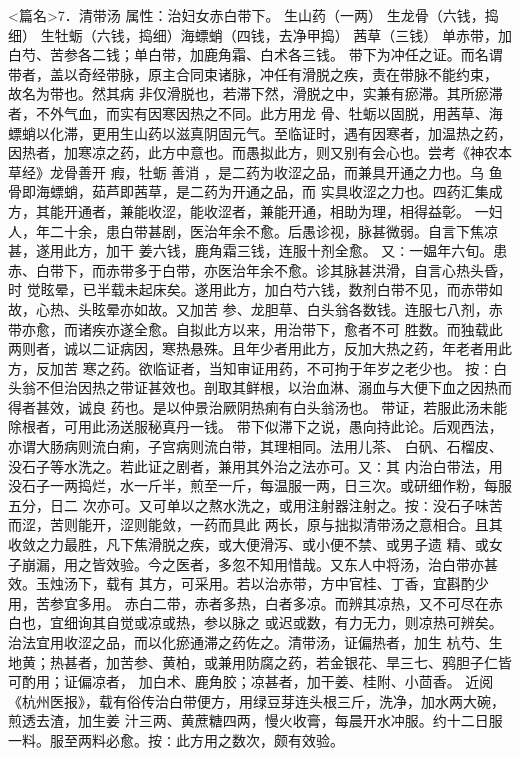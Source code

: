 \documentclass[a4paper,12pt,UTF8,twoside]{ctexbook}
\begin{document}
<篇名>7．清带汤
属性：治妇女赤白带下。 
生山药（一两） 生龙骨（六钱，捣细） 生牡蛎（六钱，捣细）海螵蛸（四钱，去净甲捣） 茜草（三钱） 
单赤带，加白芍、苦参各二钱；单白带，加鹿角霜、白术各三钱。 
带下为冲任之证。而名谓带者，盖以奇经带脉，原主合同束诸脉，冲任有滑脱之疾，责在带脉不能约束， 
故名为带也。然其病 
非仅滑脱也，若滞下然，滑脱之中，实兼有瘀滞。其所瘀滞者，不外气血，而实有因寒因热之不同。此方用龙 
骨、牡蛎以固脱，用茜草、海螵蛸以化滞，更用生山药以滋真阴固元气。至临证时，遇有因寒者，加温热之药， 
因热者，加寒凉之药，此方中意也。而愚拟此方，则又别有会心也。尝考《神农本草经》龙骨善开 瘕，牡蛎 
善消 ，是二药为收涩之品，而兼具开通之力也。乌 鱼骨即海螵蛸，茹芦即茜草，是二药为开通之品，而 
实具收涩之力也。四药汇集成方，其能开通者，兼能收涩，能收涩者，兼能开通，相助为理，相得益彰。 
一妇人，年二十余，患白带甚剧，医治年余不愈。后愚诊视，脉甚微弱。自言下焦凉甚，遂用此方，加干 
姜六钱，鹿角霜三钱，连服十剂全愈。 
又∶一媪年六旬。患赤、白带下，而赤带多于白带，亦医治年余不愈。诊其脉甚洪滑，自言心热头昏，时 
觉眩晕，已半载未起床矣。遂用此方，加白芍六钱，数剂白带不见，而赤带如故，心热、头眩晕亦如故。又加苦 
参、龙胆草、白头翁各数钱。连服七八剂，赤带亦愈，而诸疾亦遂全愈。自拟此方以来，用治带下，愈者不可 
胜数。而独载此两则者，诚以二证病因，寒热悬殊。且年少者用此方，反加大热之药，年老者用此方，反加苦 
寒之药。欲临证者，当知审证用药，不可拘于年岁之老少也。 
按∶白头翁不但治因热之带证甚效也。剖取其鲜根，以治血淋、溺血与大便下血之因热而得者甚效，诚良 
药也。是以仲景治厥阴热痢有白头翁汤也。 
带证，若服此汤未能除根者，可用此汤送服秘真丹一钱。 
带下似滞下之说，愚向持此论。后观西法，亦谓大肠病则流白痢，子宫病则流白带，其理相同。法用儿茶、 
白矾、石榴皮、没石子等水洗之。若此证之剧者，兼用其外治之法亦可。又∶其 
内治白带法，用没石子一两捣烂，水一斤半，煎至一斤，每温服一两，日三次。或研细作粉，每服五分，日二 
次亦可。又可单以之熬水洗之，或用注射器注射之。按∶没石子味苦而涩，苦则能开，涩则能敛，一药而具此 
两长，原与拙拟清带汤之意相合。且其收敛之力最胜，凡下焦滑脱之疾，或大便滑泻、或小便不禁、或男子遗 
精、或女子崩漏，用之皆效验。今之医者，多忽不知用惜哉。又东人中将汤，治白带亦甚效。玉烛汤下，载有 
其方，可采用。若以治赤带，方中官桂、丁香，宜斟酌少用，苦参宜多用。 
赤白二带，赤者多热，白者多凉。而辨其凉热，又不可尽在赤白也，宜细询其自觉或凉或热，参以脉之 
或迟或数，有力无力，则凉热可辨矣。治法宜用收涩之品，而以化瘀通滞之药佐之。清带汤，证偏热者，加生 
杭芍、生地黄；热甚者，加苦参、黄柏，或兼用防腐之药，若金银花、旱三七、鸦胆子仁皆可酌用；证偏凉者， 
加白术、鹿角胶；凉甚者，加干姜、桂附、小茴香。 
近阅《杭州医报》，载有俗传治白带便方，用绿豆芽连头根三斤，洗净，加水两大碗，煎透去渣，加生姜 
汁三两、黄蔗糖四两，慢火收膏，每晨开水冲服。约十二日服一料。服至两料必愈。按∶此方用之数次，颇有效验。 
\end{document}
